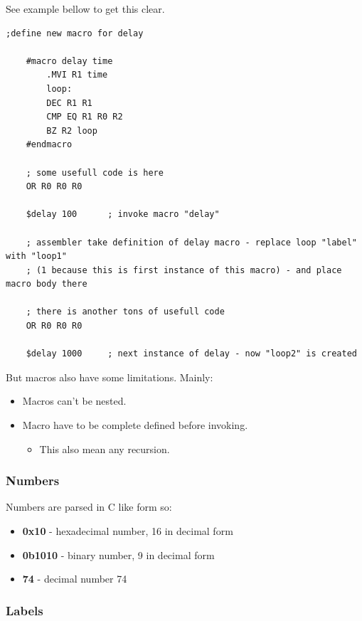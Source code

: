 See example bellow to get this clear.

\begin{lstlisting}[language={[x86masm]Assembler}, frame=single]
    ;define new macro for delay

    #macro delay time
        .MVI R1 time
        loop:
        DEC R1 R1
        CMP EQ R1 R0 R2
        BZ R2 loop
    #endmacro

    ; some usefull code is here
    OR R0 R0 R0

    $delay 100      ; invoke macro "delay"

    ; assembler take definition of delay macro - replace loop "label" with "loop1"
    ; (1 because this is first instance of this macro) - and place macro body there

    ; there is another tons of usefull code
    OR R0 R0 R0

    $delay 1000     ; next instance of delay - now "loop2" is created
\end{lstlisting}

But macros also have some limitations. Mainly:

\begin{itemize}
    \item Macros can't be nested.
    \item Macro have to be complete defined before invoking.
    \begin{itemize}
        \item This also mean any recursion.
    \end{itemize}
\end{itemize}

\subsubsection{Numbers}

Numbers are parsed in C like form so:

\begin{itemize}
    \item \textbf{0x10} - hexadecimal number, 16 in decimal form
    \item \textbf{0b1010} - binary number, 9 in decimal form
    \item \textbf{74} - decimal number 74
\end{itemize}

\subsubsection{Labels}

